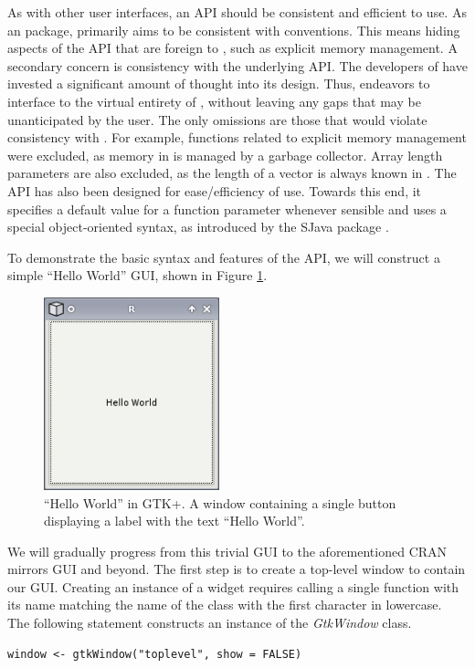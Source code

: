 \documentclass[article]{jss}
\begin{document}
As with other user interfaces,
an API should be consistent and efficient to use. As an 
package,
 primarily aims to be consistent with 
conventions. This
means hiding aspects of the  API that are foreign to
,
such as explicit memory management. A secondary concern is consistency 
with the underlying  API. The developers of
 have invested a significant amount of thought into its
design. Thus,
 endeavors to interface  to the virtual
entirety of ,
without leaving any gaps that may be unanticipated by the user. 
The only omissions are those that would violate consistency with
. For example, functions related to explicit memory
management were excluded, as memory in  is managed by a
garbage collector. Array length parameters are also excluded, as the
length of a vector is always known in .
The  API has also been designed for ease/efficiency of use.
Towards this end,
it specifies
a default value for a function parameter whenever sensible and uses a
special object-oriented syntax, as introduced by the SJava package
\citep{SJava}.

To demonstrate the basic syntax and
features of the  API, we will construct a simple ``Hello
World'' GUI,
shown in Figure \ref{fig:hello-world}. 

\begin{figure}
\begin{center}
\includegraphics[width=2in]{hello-world.png}
\caption{\label{fig:hello-world}``Hello World'' in GTK+. 
A window containing a single button displaying a label with the text
``Hello World''.}
\end{center}
\end{figure}

We will gradually 
progress from this trivial GUI to the aforementioned CRAN mirrors GUI
and beyond.
The first step is to create a top-level window to contain our GUI.
Creating an instance of a  widget requires calling a single
function with its name matching the name of the class with the first
character in 
lowercase. The following statement constructs an instance of the
\emph{GtkWindow} class.
\begin{verbatim}
window <- gtkWindow("toplevel", show = FALSE)
\end{verbatim}
\end{document}
